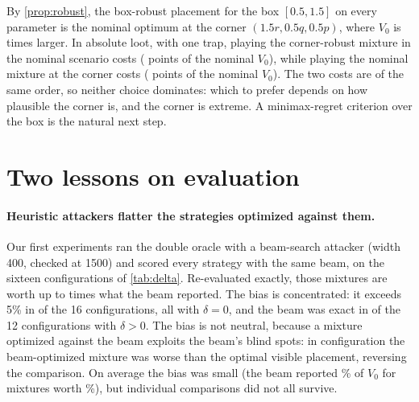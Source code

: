\documentclass[runningheads]{llncs}
\begin{document}
By \cref{prop:robust}, the box-robust placement for the box $[0.5,1.5]$ on every parameter is the nominal optimum at the corner $(1.5r,0.5q,0.5p)$, where $V_0$ is \CornerVzeroOne{} times larger. In absolute loot, with one trap, playing the corner-robust mixture in the nominal scenario costs \PriceRobAbsOne{} (\PriceRobPctOne{} points of the nominal $V_0$), while playing the nominal mixture at the corner costs \RegretCornerAbsOne{} (\RegretCornerPctOne{} points of the nominal $V_0$). The two costs are of the same order, so neither choice dominates: which to prefer depends on how plausible the corner is, and the corner is extreme. A minimax-regret criterion over the box is the natural next step.

\section{Two lessons on evaluation}\label{sec:lessons}

\paragraph{Heuristic attackers flatter the strategies optimized against them.}
Our first experiments ran the double oracle with a beam-search attacker (width 400, checked at 1500) and scored every strategy with the same beam, on the sixteen configurations of \cref{tab:delta}. Re-evaluated exactly, those mixtures are worth up to \BeamBiasMax{} times what the beam reported. The bias is concentrated: it exceeds 5\% in \BeamBiasOverFive{} of the 16 configurations, all with $\delta=0$, and the beam was exact in \BeamExactOther{} of the 12 configurations with $\delta>0$. The bias is not neutral, because a mixture optimized against the beam exploits the beam's blind spots: in \BeamWorseCount{} configuration the beam-optimized mixture was worse than the optimal visible placement, reversing the comparison. On average the bias was small (the beam reported \BeamAvgReported\% of $V_0$ for mixtures worth \BeamAvgExact\%), but individual comparisons did not all survive.
\end{document}

